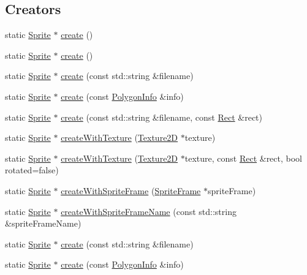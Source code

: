 \subsection*{Creators}
\begin{DoxyCompactItemize}
\item 
static \hyperlink{classSprite}{Sprite} $\ast$ \hyperlink{classSprite_a6b7ca689b01646e2c58a9ffae3683413}{create} ()
\item 
static \hyperlink{classSprite}{Sprite} $\ast$ \hyperlink{classSprite_a3f75a553fe02f3de82042e81b76da010}{create} ()
\item 
static \hyperlink{classSprite}{Sprite} $\ast$ \hyperlink{classSprite_a80bcbb41b563c742488dddcc5e9aeedb}{create} (const std\+::string \&filename)
\item 
static \hyperlink{classSprite}{Sprite} $\ast$ \hyperlink{classSprite_af99c68d85cd5be179a37d7dbf59f7bf7}{create} (const \hyperlink{classPolygonInfo}{Polygon\+Info} \&info)
\item 
static \hyperlink{classSprite}{Sprite} $\ast$ \hyperlink{classSprite_ab076431dfa6f2bd840fee3eba1c5b287}{create} (const std\+::string \&filename, const \hyperlink{classRect}{Rect} \&rect)
\item 
static \hyperlink{classSprite}{Sprite} $\ast$ \hyperlink{classSprite_a8d9023960cc3b3d3b6c8109e0a778cdc}{create\+With\+Texture} (\hyperlink{classTexture2D}{Texture2D} $\ast$texture)
\item 
static \hyperlink{classSprite}{Sprite} $\ast$ \hyperlink{classSprite_a8648b5df6362f90dc86a2e075c97932a}{create\+With\+Texture} (\hyperlink{classTexture2D}{Texture2D} $\ast$texture, const \hyperlink{classRect}{Rect} \&rect, bool rotated=false)
\item 
static \hyperlink{classSprite}{Sprite} $\ast$ \hyperlink{classSprite_a3372a4e3fd88e2a1470a902b940aef42}{create\+With\+Sprite\+Frame} (\hyperlink{classSpriteFrame}{Sprite\+Frame} $\ast$sprite\+Frame)
\item 
static \hyperlink{classSprite}{Sprite} $\ast$ \hyperlink{classSprite_adae417277d290022e3499d905ead5d5a}{create\+With\+Sprite\+Frame\+Name} (const std\+::string \&sprite\+Frame\+Name)
\item 
static \hyperlink{classSprite}{Sprite} $\ast$ \hyperlink{classSprite_ad07599ae8d827884180984bfe037929d}{create} (const std\+::string \&filename)
\item 
static \hyperlink{classSprite}{Sprite} $\ast$ \hyperlink{classSprite_ae388510394459cfefdeacc96db7c7d5c}{create} (const \hyperlink{classPolygonInfo}{Polygon\+Info} \&info)

\end{DoxyCompactItemize}
